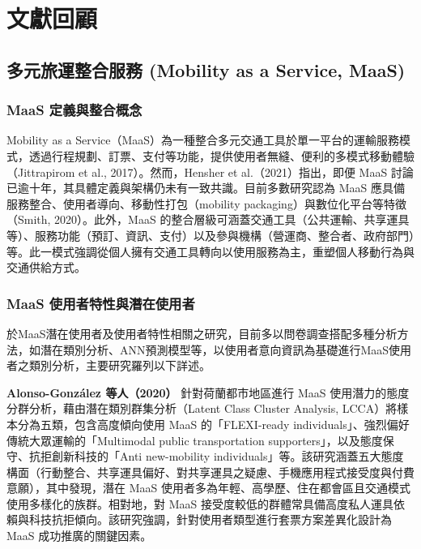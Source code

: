 
\providecommand{\tightlist}{%
  \setlength{\itemsep}{0pt}\setlength{\parskip}{0pt}
}

\chapter{文獻回顧}\label{ux6587ux737bux56deux9867}

\section{多元旅運整合服務 (Mobility as a Service,
MaaS)}\label{ux591aux5143ux65c5ux904bux6574ux5408ux670dux52d9-mobility-as-a-service-maas}

\subsection{MaaS
定義與整合概念}\label{maas-ux5b9aux7fa9ux8207ux6574ux5408ux6982ux5ff5}

Mobility as a
Service（MaaS）為一種整合多元交通工具於單一平台的運輸服務模式，透過行程規劃、訂票、支付等功能，提供使用者無縫、便利的多模式移動體驗（Jittrapirom
et al., 2017）。然而，Hensher et al.（2021）指出，即便 MaaS
討論已逾十年，其具體定義與架構仍未有一致共識。目前多數研究認為 MaaS
應具備服務整合、使用者導向、移動性打包（mobility
packaging）與數位化平台等特徵（Smith, 2020）。此外，MaaS
的整合層級可涵蓋交通工具（公共運輸、共享運具等）、服務功能（預訂、資訊、支付）以及參與機構（營運商、整合者、政府部門）等。此一模式強調從個人擁有交通工具轉向以使用服務為主，重塑個人移動行為與交通供給方式。

\subsection{MaaS
使用者特性與潛在使用者}\label{maas-ux4f7fux7528ux8005ux7279ux6027ux8207ux6f5bux5728ux4f7fux7528ux8005}

於MaaS潛在使用者及使用者特性相關之研究，目前多以問卷調查搭配多種分析方法，如潛在類別分析、ANN預測模型等，以使用者意向資訊為基礎進行MaaS使用者之類別分析，主要研究羅列以下詳述。

\textbf{Alonso-González 等人（2020）} 針對荷蘭都市地區進行 MaaS
使用潛力的態度分群分析，藉由潛在類別群集分析（Latent Class Cluster
Analysis, LCCA）將樣本分為五類，包含高度傾向使用 MaaS 的「FLEXI-ready
individuals」、強烈偏好傳統大眾運輸的「Multimodal public transportation
supporters」，以及態度保守、抗拒創新科技的「Anti new-mobility
individuals」等。該研究涵蓋五大態度構面（行動整合、共享運具偏好、對共享運具之疑慮、手機應用程式接受度與付費意願），其中發現，潛在
MaaS
使用者多為年輕、高學歷、住在都會區且交通模式使用多樣化的族群。相對地，對
MaaS
接受度較低的群體常具備高度私人運具依賴與科技抗拒傾向。該研究強調，針對使用者類型進行套票方案差異化設計為
MaaS 成功推廣的關鍵因素。

